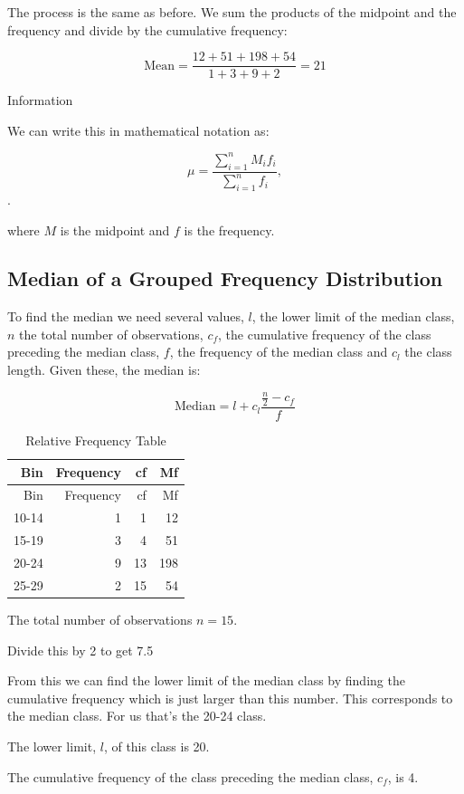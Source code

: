 \documentclass[
]{book}
\begin{document}
The process is the same as before. We sum the products of the midpoint and the frequency and divide by the cumulative frequency:

\[\textrm{Mean}=\frac{12+51+198+54}{1+3+9+2}=21\]

Information

We can write this in mathematical notation as:

\[ \mu=\frac{\sum_{i=1}^n M_i f_i}{\sum_{i=1}^n f_i},\].

where \(M\) is the midpoint and \(f\) is the frequency.

\hypertarget{median-of-a-grouped-frequency-distribution}{%
\subsection{Median of a Grouped Frequency Distribution}\label{median-of-a-grouped-frequency-distribution}}

To find the median we need several values, \(l\), the lower limit of the median class, \(n\) the total number of observations, \(c_f\), the cumulative frequency of the class preceding the median class, \(f\), the frequency of the median class and \(c_l\) the class length. Given these, the median is:

\[\textrm{Median}=l + c_l \frac{\frac{n}{2}-c_f}{f} \]

\begin{longtable}[]{@{}rrrr@{}}
\caption{\label{tab:table0000007}Relative Frequency Table}\tabularnewline
\toprule
Bin & Frequency & cf & Mf \\
\midrule
\endfirsthead
\toprule
Bin & Frequency & cf & Mf \\
\midrule
\endhead
10-14 & 1 & 1 & 12 \\
15-19 & 3 & 4 & 51 \\
20-24 & 9 & 13 & 198 \\
25-29 & 2 & 15 & 54 \\
\bottomrule
\end{longtable}

The total number of observations \(n = 15\).

Divide this by 2 to get 7.5

From this we can find the lower limit of the median class by finding the cumulative frequency which is just larger than this number. This corresponds to the median class. For us that's the 20-24 class.

The lower limit, \(l\), of this class is 20.

The cumulative frequency of the class preceding the median class, \(c_f\), is 4.
\end{document}
